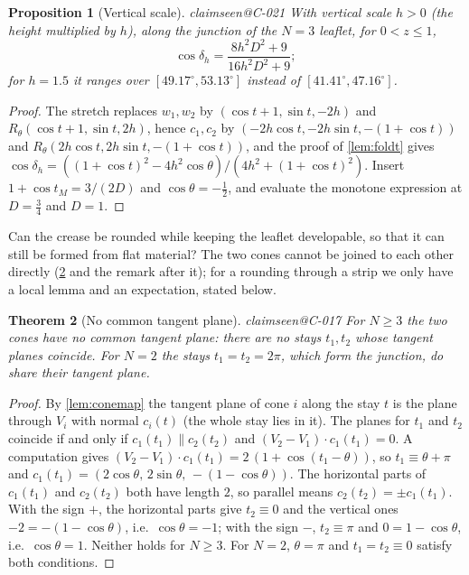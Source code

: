\documentclass[11pt,a4paper]{article}
\makeatletter
\theoremstyle{plain}
\newtheorem{theorem}{Theorem}[section]
\newtheorem{proposition}[theorem]{Proposition}
\theoremstyle{remark}
\newcommand{\claim}[1]{\ifcsname claimseen@#1\endcsname\else\expandafter\gdef\csname claimseen@#1\endcsname{}\label{claim:#1}\fi}
\makeatother
\begin{document}
\begin{proposition}[Vertical scale]\label{prop:vscale}\claim{C-021}
With vertical scale $h>0$ (the height multiplied by $h$), along the junction of the $N=3$ leaflet, for $0<z\le1$,
\[ \cos\delta_h=\frac{8h^2D^2+9}{16h^2D^2+9}; \]
for $h=1.5$ it ranges over $[49.17^\circ,53.13^\circ]$ instead of $[41.41^\circ,47.16^\circ]$.
\end{proposition}
\begin{proof}
The stretch replaces $w_1,w_2$ by $(\cos t+1,\sin t,-2h)$ and $R_\theta(\cos t+1,\sin t,2h)$, hence $c_1,c_2$ by
$(-2h\cos t,-2h\sin t,-(1+\cos t))$ and $R_\theta(2h\cos t,2h\sin t,-(1+\cos t))$, and the proof of \cref{lem:foldt} gives
$\cos\delta_h=((1+\cos t)^2-4h^2\cos\theta)/(4h^2+(1+\cos t)^2)$. Insert $1+\cos t_M=3/(2D)$ and $\cos\theta=-\frac12$, and
evaluate the monotone expression at $D=\frac34$ and $D=1$.
\end{proof}

Can the crease be rounded while keeping the leaflet developable, so that it can still be formed from flat material? The
two cones cannot be joined to each other directly (\cref{thm:nocommon} and the remark after it); for a rounding through a
strip we only have a local lemma and an expectation, stated below.

\begin{theorem}[No common tangent plane]\label{thm:nocommon}\claim{C-017}
For $N\ge3$ the two cones have no common tangent plane: there are no stays $t_1,t_2$ whose tangent planes coincide. For
$N=2$ the stays $t_1=t_2=2\pi$, which form the junction, do share their tangent plane.
\end{theorem}
\begin{proof}
By \cref{lem:conemap} the tangent plane of cone $i$ along the stay $t$ is the plane through $V_i$ with normal $c_i(t)$
(the whole stay lies in it). The planes for $t_1$ and $t_2$ coincide if and only if $c_1(t_1)\parallel c_2(t_2)$ and
$(V_2-V_1)\cdot c_1(t_1)=0$. A computation gives $(V_2-V_1)\cdot c_1(t_1)=2\,(1+\cos(t_1-\theta))$, so
$t_1\equiv\theta+\pi$ and $c_1(t_1)=(2\cos\theta,\,2\sin\theta,\,-(1-\cos\theta))$. The horizontal parts of $c_1(t_1)$ and
$c_2(t_2)$ both have length $2$, so parallel means $c_2(t_2)=\pm c_1(t_1)$. With the sign $+$, the horizontal parts give
$t_2\equiv0$ and the vertical ones $-2=-(1-\cos\theta)$, i.e.\ $\cos\theta=-1$; with the sign $-$, $t_2\equiv\pi$ and
$0=1-\cos\theta$, i.e.\ $\cos\theta=1$. Neither holds for $N\ge3$. For $N=2$, $\theta=\pi$ and $t_1=t_2\equiv0$ satisfy both
conditions.
\end{proof}
\end{document}
